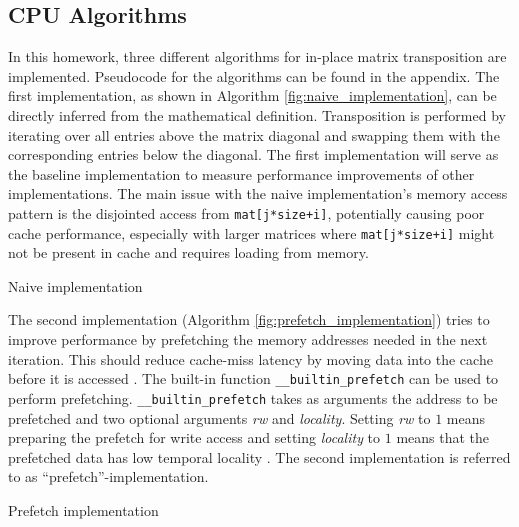 \documentclass[conference]{IEEEtran}
\begin{document}
    \subsection{CPU Algorithms}
    In this homework, three different algorithms for in-place matrix transposition are implemented. Pseudocode for the algorithms can be found in the appendix. The first implementation, as shown in Algorithm \ref{fig:naive_implementation}, can be directly inferred from the mathematical definition. Transposition is performed by iterating over all entries above the matrix diagonal and swapping them with the corresponding entries below the diagonal. The first implementation will serve as the baseline implementation to measure performance improvements of other implementations. 
    The main issue with the naive implementation's memory access pattern is the disjointed access from \lstinline{mat[j*size+i]}, potentially causing poor cache performance, especially with larger matrices where \lstinline{mat[j*size+i]} might not be present in cache and requires loading from memory.
    \begin{algorithm}
        \BlankLine
        \caption{Naive implementation}
        \label{fig:naive_implementation}   
    \end{algorithm}
    The second implementation (Algorithm \ref{fig:prefetch_implementation}) tries to improve performance by prefetching the memory addresses needed in the next iteration. This should reduce cache-miss latency by moving data into the cache before it is accessed \cite{gccdocs}. The built-in function \lstinline{__builtin_prefetch} can be used to perform prefetching. \lstinline{__builtin_prefetch} takes as arguments the address to be prefetched and two optional arguments \textit{rw} and \textit{locality}. Setting \textit{rw} to $1$ means preparing the prefetch for write access and setting \textit{locality} to $1$ means that the prefetched data has low temporal locality \cite{gccdocs}. The second implementation is referred to as ``prefetch''-implementation.
    \begin{algorithm}
        \BlankLine
        \caption{Prefetch implementation}
        \label{fig:prefetch_implementation}        
    \end{algorithm}
\end{document}
